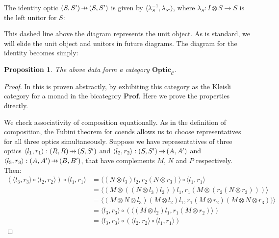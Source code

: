 \documentclass[11pt,a4paper]{article}
\theoremstyle{plain}
\newtheorem{proposition}[theorem]{Proposition}
\theoremstyle{definition}
\newcommand{\C}{\mathscr{C}}
\newcommand{\Prof}{\mathbf{Prof}}
\newcommand{\Optic}{\mathbf{Optic}}
\newcommand{\hto}{\ensuremath{\,\mathaccent\shortmid\rightarrow\,}}
\begin{document}
The identity optic $(S, S') \hto (S, S')$ is given by $\langle \lambda^{-1}_S, \lambda_{S'} \rangle$, where $\lambda_S : I \otimes S \to S$ is the left unitor for $S$: 
\begin{center}

\end{center}
This dashed line above the diagram represents the unit object. As is standard, we will elide the unit object and unitors in future diagrams. The diagram for the identity becomes simply:
\begin{center}

\end{center}

\begin{proposition}
The above data form a category $\Optic_\C$.
\end{proposition}
\begin{proof}
In \cite[Section 6]{Doubles} this is proven abstractly, by exhibiting this category as the Kleisli category for a monad in the bicategory $\Prof$. Here we prove the properties directly.

We check associativity of composition equationally. As in the definition of composition, the Fubini theorem for coends allows us to choose representatives for all three optics simultaneously. Suppose we have representatives of three optics $\langle l_1, r_1\rangle : (R, R) \hto (S, S')$ and $\langle l_2, r_2 \rangle : (S, S') \hto (A, A')$ and $\langle l_3, r_3 \rangle : (A, A') \hto (B, B')$, that have complements $M$, $N$ and $P$ respectively. Then:
\begin{align*}
(\langle l_3, r_3 \rangle \circ \langle l_2, r_2 \rangle) \circ \langle l_1, r_1 \rangle 
&= \langle (N \otimes l_3)l_2, r_2(N \otimes r_3) \rangle \circ \langle l_1, r_1 \rangle \\
&= \langle (M \otimes ((N \otimes l_3)l_2))l_1, r_1(M \otimes (r_2(N \otimes r_3))) \rangle \\
&= \langle (M \otimes N \otimes l_3)(M \otimes l_2)l_1, r_1(M \otimes r_2)(M \otimes N \otimes r_3)) \rangle \\
&= \langle l_3, r_3 \rangle \circ (\langle (M \otimes l_2)l_1, r_1(M \otimes r_2) \rangle) \\
&= \langle l_3, r_3 \rangle \circ (\langle l_2, r_2 \rangle \circ \langle l_1, r_1 \rangle)
\end{align*}


\end{proof}
\end{document}
